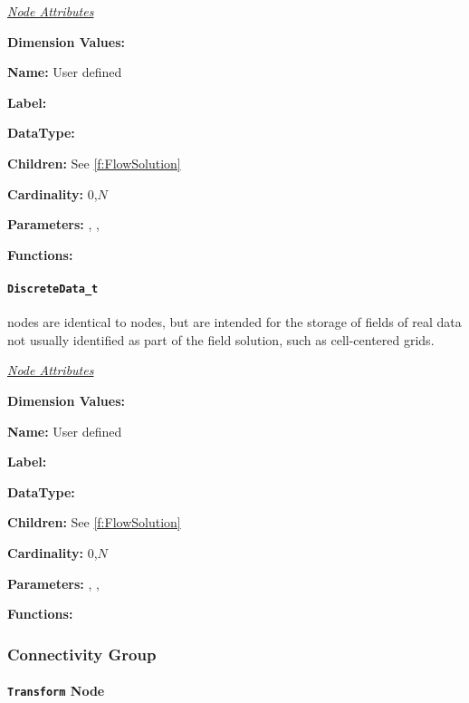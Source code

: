 \textit{\uline{Node Attributes}}
\begin{Ventryic}{\textbf{Dimension Values:}}
\item [\textbf{Name:}]
      User defined
\item [\textbf{Label:}]
\item [\textbf{DataType:}]
\item [\textbf{Children:}]
      See \autoref{f:FlowSolution}
\item [\textbf{Cardinality:}]
      0,$N$
\item [\textbf{Parameters:}]
      , , 
\item [\textbf{Functions:}]
\end{Ventryic}

\paragraph{\texttt{DiscreteData\_t}}

 nodes are identical to 
nodes, but are intended for the storage of fields of real data not
usually identified as part of the field solution, such as cell-centered
grids.

\textit{\uline{Node Attributes}}
\begin{Ventryic}{\textbf{Dimension Values:}}
\item [\textbf{Name:}]
      User defined
\item [\textbf{Label:}]
\item [\textbf{DataType:}]
\item [\textbf{Children:}]
      See \autoref{f:FlowSolution}
\item [\textbf{Cardinality:}]
      0,$N$
\item [\textbf{Parameters:}]
      , , 
\item [\textbf{Functions:}]
\end{Ventryic}

\subsubsection{Connectivity Group}

\paragraph{\texttt{Transform} Node}

